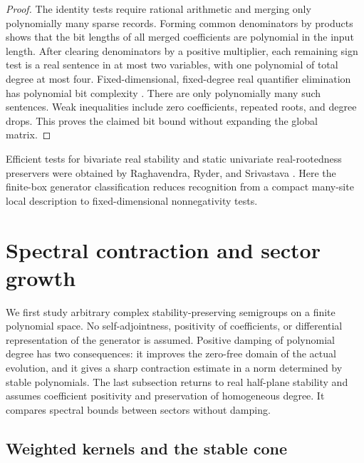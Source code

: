 \documentclass[reqno]{amsart}
\theoremstyle{definition}
\theoremstyle{remark}
\begin{document}
\begin{proof}
The identity tests require rational arithmetic and merging only
polynomially many sparse records. Forming common denominators by
products shows that the bit lengths of all merged coefficients are
polynomial in the input length. After clearing denominators by a
positive multiplier, each remaining sign test is a real sentence
in at most two variables, with one polynomial of total degree at
most four. Fixed-dimensional, fixed-degree real quantifier elimination
has polynomial bit complexity \cite[Chapter~14]{BasuPollackRoy06}.
There are only polynomially many such sentences. Weak inequalities
include zero coefficients, repeated roots, and degree drops. This
proves the claimed bit bound without expanding the global matrix.
\end{proof}

Efficient tests for bivariate real stability and static univariate
real-rootedness preservers were obtained by Raghavendra, Ryder, and
Srivastava \cite{RaghavendraRyderSrivastava17}. Here the finite-box
generator classification reduces recognition from a compact many-site
local description to fixed-dimensional nonnegativity tests.


\section{Spectral contraction and sector growth}\label{spec:section}

We first study arbitrary complex stability-preserving
semigroups on a finite polynomial space.  No self-adjointness, positivity of
coefficients, or differential representation of the generator is assumed.
Positive damping of polynomial degree has two consequences: it improves the
zero-free domain of the actual evolution, and it gives a sharp contraction
estimate in a norm determined by stable polynomials.
The last subsection returns to real half-plane stability and assumes
coefficient positivity and preservation of homogeneous degree.
It compares spectral bounds between sectors without damping.

\subsection{Weighted kernels and the stable cone}
\end{document}
